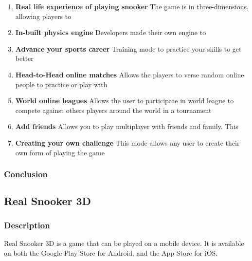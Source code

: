 \documentclass[11pt,a4paper]{report}
\begin{document}
\begin{enumerate}
    \item \textbf{Real life experience of playing snooker }
    \newline The game is in three-dimensions, allowing players to

    \item \textbf{In-built physics engine}
    \newline Developers made their own engine to

    \item \textbf{Advance your sports career}
    \newline Training mode to practice your skills to get better

    \item \textbf{Head-to-Head online matches}
    \newline Allows the players to verse random online people to practice or play with

    \item \textbf{World online leagues}
    \newline Allows the user to participate in world league to compete against others players around the world in a tournament

    \item \textbf{Add friends}
    \newline Allows you to play multiplayer with friends and family. This

    \item \textbf{Creating your own challenge}
    \newline This mode allows any user to create their own form of playing the game

\end{enumerate}

\subsubsection{Conclusion}


\subsection{Real Snooker 3D}

\subsubsection{Description}
Real Snooker 3D is a game that can be played on a mobile device. It is available on both the Google Play Store for Android, and the App Store for iOS.
\end{document}
